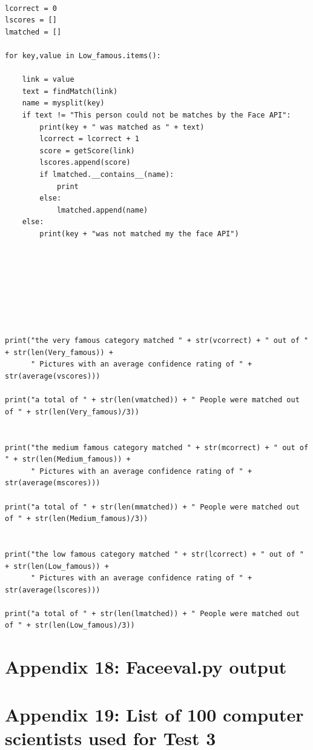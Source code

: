 \documentclass[12pt,a4paper]{article}
\begin{document}
\begin{appendices}
\begin{lstlisting}
        
lcorrect = 0 
lscores = [] 
lmatched = [] 

for key,value in Low_famous.items():
     
    link = value  
    text = findMatch(link) 
    name = mysplit(key)     
    if text != "This person could not be matches by the Face API":  
        print(key + " was matched as " + text)  
        lcorrect = lcorrect + 1  
        score = getScore(link)
        lscores.append(score) 
        if lmatched.__contains__(name): 
            print 
        else: 
            lmatched.append(name)
    else: 
        print(key + "was not matched my the face API")         
        
        
        
        
        
        

        
print("the very famous category matched " + str(vcorrect) + " out of " + str(len(Very_famous)) + 
      " Pictures with an average confidence rating of " + str(average(vscores)))  

print("a total of " + str(len(vmatched)) + " People were matched out of " + str(len(Very_famous)/3))  


print("the medium famous category matched " + str(mcorrect) + " out of " + str(len(Medium_famous)) + 
      " Pictures with an average confidence rating of " + str(average(mscores)))  

print("a total of " + str(len(mmatched)) + " People were matched out of " + str(len(Medium_famous)/3))  


print("the low famous category matched " + str(lcorrect) + " out of " + str(len(Low_famous)) + 
      " Pictures with an average confidence rating of " + str(average(lscores)))   

print("a total of " + str(len(lmatched)) + " People were matched out of " + str(len(Low_famous)/3))
\end{lstlisting}
\section{Appendix 18: Face\textunderscore eval.py output} 
\section{Appendix 19: List of 100 computer scientists used for Test 3}


\end{appendices}
\end{document}

